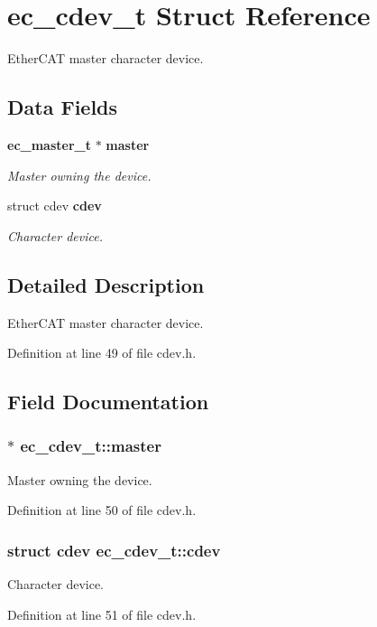 \section{ec\-\_\-cdev\-\_\-t Struct Reference}
\label{structec__cdev__t}


Ether\-C\-A\-T master character device.  


\subsection*{Data Fields}
\begin{DoxyCompactItemize}
\item 
{\bf ec\-\_\-master\-\_\-t} $\ast$ {\bf master}
\begin{DoxyCompactList}\small\item\em Master owning the device. \end{DoxyCompactList}\item 
struct cdev {\bf cdev}
\begin{DoxyCompactList}\small\item\em Character device. \end{DoxyCompactList}\end{DoxyCompactItemize}


\subsection{Detailed Description}
Ether\-C\-A\-T master character device. 

Definition at line 49 of file cdev.\-h.



\subsection{Field Documentation}
\subsubsection[{master}]{$\ast$ ec\-\_\-cdev\-\_\-t\-::master}\label{structec__cdev__t_ad6d790982111fa9d63a1e0d1baf0828f}


Master owning the device. 



Definition at line 50 of file cdev.\-h.

\subsubsection[{cdev}]{\setlength{\rightskip}{0pt plus 5cm}struct cdev ec\-\_\-cdev\-\_\-t\-::cdev}\label{structec__cdev__t_a5595c2c852f7a794ca343013e96e619a}


Character device. 



Definition at line 51 of file cdev.\-h.

